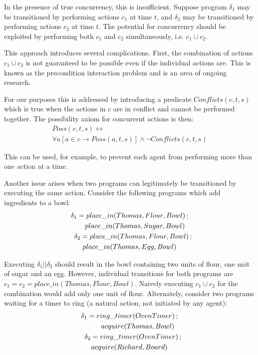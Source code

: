 \documentclass[letterpaper]{article}
\begin{document}
In the presence of true concurrency, this is insufficient. Suppose program
$\delta_1$ may be transitioned by performing actions $c_1$ at time $t$, and
$\delta_2$ may be transitioned by performing actions $c_2$ at time $t$.
The potential for concurrency should be exploited by performing both $c_1$
and $c_2$ simultaneously, i.e. $c_1 \cup c_2$.

This approach introduces several complications. First, the combination
of actions $c_{1}\cup c_{2}$ is not guaranteed to be possible even if the
individual actions are.
This is known as the precondition interaction problem \cite{pinto94temporal}
and is an area of ongoing research.

For our purposes this is addressed by introducing a predicate $Conflicts(c,t,s)$
which is true when the actions in $c$ are in conflict and cannot
be performed together. The possibility axiom for concurrent actions
is then:
\begin{multline}
\label{eqn:poss_conc_acts}
Poss(c,t,s)\leftrightarrow\\
\forall a\left[a\in c\rightarrow Poss(a,t,s)\right]\wedge\neg Conflicts(c,t,s)
\end{multline}

This can be used, for example, to prevent each agent from performing
more than one action at a time.

Another issue arises when two programs can legitimately be transitioned
by executing the same action. Consider the following programs which
add ingredients to a bowl:
\begin{multline}
\delta_{1}=place\_ in(Thomas,Flour,Bowl)\,;\\
   \shoveright{place\_ in(Thomas,Sugar,Bowl)}\\
\shoveleft{\delta_{2}=place\_ in(Thomas,Flour,Bowl)\,;}\\
   place\_ in(Thomas,Egg,Bowl)
\end{multline}

Executing $\delta_{1}||\delta_{2}$ should result in the bowl containing
two units of flour, one unit of sugar and an egg. However, individual
transitions for both programs are $c_{1}=c_{2}=place\_ in(Thomas,Flour,Bowl)$.
Naively executing $c_1 \cup c_2$ for the combination would add only one unit
of flour. Alternately, consider two programs
waiting for a timer to ring (a natural action, not initiated by any agent):
\begin{multline}
\delta_{1}=ring\_ timer(OvenTimer)\,;\\
   \shoveright{acquire(Thomas,Bowl)}\\
\shoveleft{\delta_{2}=ring\_ timer(OvenTimer)\,;}\\
    acquire(Richard,Board)
\end{multline}
\end{document}

